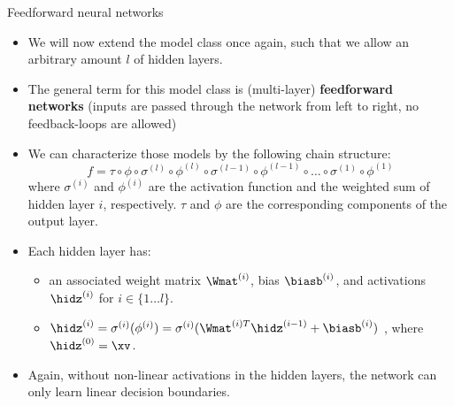 \documentclass[11pt,compress,t,notes=noshow, xcolor=table]{beamer}
\begin{document}

\begin{vbframe}{Feedforward neural networks}
\begin{itemize}
\vspace{15mm}
\item We will now extend the model class once again, such that we allow an arbitrary amount $l$ of hidden layers.
\vspace{5mm}
\item The general term for this model class is (multi-layer) \textbf{feedforward networks} (inputs are passed through the network from left to right, no feedback-loops are allowed)
\end{itemize}
\framebreak

\begin{itemize}
\item We can characterize those models by the following chain structure: $$f = \tau \circ \phi \circ \sigma^{(l)} \circ \phi^{(l)} \circ \sigma^{(l-1)} \circ \phi^{(l-1)} \circ \ldots \circ \sigma^{(1)} \circ \phi^{(1)}$$ where $\sigma^{(i)}$ and $\phi^{(i)}$ are the activation function and the weighted sum of hidden layer $i$, respectively. $\tau$ and $\phi$ are the corresponding components of the output layer.
\vspace{5mm}
\item Each hidden layer has: 
\begin{itemize}
\vspace{2mm}
\item an associated weight matrix $\Wmat^{(i)}$, bias $\biasb^{(i)}$, and activations $\hidz^{(i)}$ for $i \in \{ 1 \ldots l\}$.
\vspace{2mm}
\item $\hidz^{(i)} = \sigma^{(i)}(\phi^{(i)}) = \sigma^{(i)}(\Wmat^{(i)T}\hidz^{(i - 1)} + \biasb^{(i)})$ , where $\hidz^{(0)} = \xv$.
\end{itemize}
\vspace{5mm}
\item Again, without non-linear activations in the hidden layers, the network can only learn linear decision boundaries.
  \end{itemize}
\framebreak


\end{vbframe}
\end{document}
